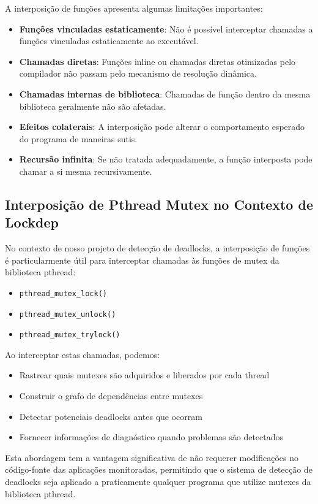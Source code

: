 A interposição de funções apresenta algumas limitações importantes:

\begin{itemize}
    \item \textbf{Funções vinculadas estaticamente}: Não é possível interceptar chamadas a funções vinculadas estaticamente ao executável.
    \item \textbf{Chamadas diretas}: Funções inline ou chamadas diretas otimizadas pelo compilador não passam pelo mecanismo de resolução dinâmica.
    \item \textbf{Chamadas internas de biblioteca}: Chamadas de função dentro da mesma biblioteca geralmente não são afetadas.
    \item \textbf{Efeitos colaterais}: A interposição pode alterar o comportamento esperado do programa de maneiras sutis.
    \item \textbf{Recursão infinita}: Se não tratada adequadamente, a função interposta pode chamar a si mesma recursivamente.
\end{itemize}

\subsection{Interposição de Pthread Mutex no Contexto de Lockdep}

No contexto de nosso projeto de detecção de deadlocks, a interposição de funções é particularmente útil para interceptar chamadas às funções de mutex da biblioteca pthread:

\begin{itemize}
    \item \texttt{pthread\_mutex\_lock()}
    \item \texttt{pthread\_mutex\_unlock()}
    \item \texttt{pthread\_mutex\_trylock()}
\end{itemize}

Ao interceptar estas chamadas, podemos:
\begin{itemize}
    \item Rastrear quais mutexes são adquiridos e liberados por cada thread
    \item Construir o grafo de dependências entre mutexes
    \item Detectar potenciais deadlocks antes que ocorram
    \item Fornecer informações de diagnóstico quando problemas são detectados
\end{itemize}

Esta abordagem tem a vantagem significativa de não requerer modificações no código-fonte das aplicações monitoradas, permitindo que o sistema de detecção de deadlocks seja aplicado a praticamente qualquer programa que utilize mutexes da biblioteca pthread.
